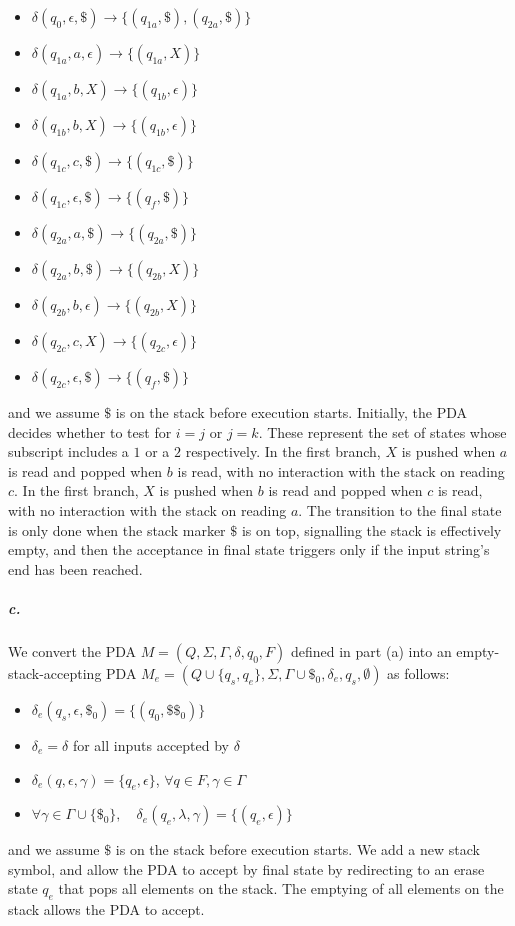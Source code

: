 \documentclass[]{article}
\begin{document}
	\begin{itemize}[label={}, noitemsep]
		\item $\delta(q_0, \epsilon, \$) \rightarrow \{(q_{1a}, \$), (q_{2a}, \$)\}$
		\item $\delta(q_{1a}, a, \epsilon) \rightarrow \{(q_{1a}, X)\}$
		\item $\delta(q_{1a}, b, X) \rightarrow \{(q_{1b}, \epsilon)\}$
		\item $\delta(q_{1b}, b, X) \rightarrow \{(q_{1b}, \epsilon)\}$
		\item $\delta(q_{1c}, c, \$) \rightarrow \{(q_{1c}, \$)\}$
		\item $\delta(q_{1c}, \epsilon, \$) \rightarrow \{(q_f, \$)\}$
		\item $\delta(q_{2a}, a, \$) \rightarrow \{(q_{2a}, \$)\}$
		\item $\delta(q_{2a}, b, \$) \rightarrow \{(q_{2b}, X)\}$
		\item $\delta(q_{2b}, b, \epsilon) \rightarrow \{(q_{2b}, X)\}$
		\item $\delta(q_{2c}, c, X) \rightarrow \{(q_{2c}, \epsilon)\}$
		\item $\delta(q_{2c}, \epsilon, \$) \rightarrow \{(q_f, \$)\}$
	\end{itemize}
	and we assume $\$$ is on the stack before execution starts.
	Initially, the PDA decides whether to test for $i = j$ or $j = k$. These represent the set of states whose subscript includes a $1$ or a $2$ respectively. In the first branch, $X$ is pushed when $a$ is read and popped when $b$ is read, with no interaction with the stack on reading $c$. In the first branch, $X$ is pushed when $b$ is read and popped when $c$ is read, with no interaction with the stack on reading $a$. The transition to the final state is only done when the stack marker $\$$ is on top, signalling the stack is effectively empty, and then the acceptance in final state triggers only if the input string's end has been reached.
	\subparagraph{c.}
	We convert the PDA $M = (Q, \Sigma, \Gamma, \delta, q_0, F)$ defined in part (a) into an empty-stack-accepting PDA $M_e = (Q \cup \{q_s, q_e\}, \Sigma, \Gamma \cup {\$_0}, \delta_e, q_s, \emptyset)$ as follows:
	\begin{itemize}[label={}, noitemsep]
		\item $\delta_e (q_s, \epsilon, \$_0) = \{(q_0, \$\$_0)\}$
		\item $\delta_e = \delta$ for all inputs accepted by $\delta$		
		\item $\delta_e (q, \epsilon, \gamma) = \{q_e, \epsilon\}$, $\forall q \in F, \gamma \in \Gamma$
		\item $\forall \gamma \in \Gamma \cup \{\$_0\}, \quad \delta_e (q_e, \lambda, \gamma) = \{(q_e, \epsilon)\}$
	\end{itemize}
	and we assume $\$$ is on the stack before execution starts.
	We add a new stack symbol, and allow the PDA to accept by final state by redirecting to an erase state $q_e$ that pops all elements on the stack. The emptying of all elements on the stack allows the PDA to accept.
	
\end{document}
